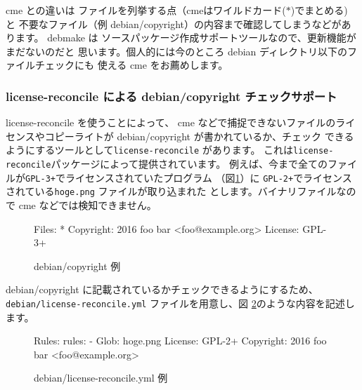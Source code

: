 \documentclass[mingoth,a4paper]{jsarticle}
\begin{document}

cme との違いは ファイルを列挙する点（cmeはワイルドカード($\ast$)でまとめる)
と 不要なファイル（例 debian/copyright）の内容まで確認してしまうなどがあります。
debmake は ソースパッケージ作成サポートツールなので、更新機能がまだないのだと
思います。個人的には今のところ debian ディレクトリ以下のファイルチェックにも
使える cme をお薦めします。

\subsubsection{license-reconcile による debian/copyright チェックサポート}


license-reconcile を使うことによって、
cme などで捕捉できないファイルのライセンスやコピーライトが debian/copyright が書かれているか、チェック
できるようにするツールとして\texttt{license-reconcile} があります。
これは\texttt{license-reconcile}パッケージによって提供されています。
例えば、今まで全てのファイルが\texttt{GPL-3+}でライセンスされていたプログラム
（図\ref{fig:example-copyright}）に
\texttt{GPL-2+}でライセンスされている\texttt{hoge.png} ファイルが取り込まれた
とします。バイナリファイルなので cme などでは検知できません。

\begin{figure}[htbp]
\begin{center}
\begin{commandline}
Files: *
Copyright: 2016 foo bar <foo@example.org>
License: GPL-3+
\end{commandline}
\end{center}
\caption{debian/copyright 例}
\label{fig:example-copyright}
\end{figure}

debian/copyright に記載されているかチェックできるようにするため、
\texttt{debian/license-reconcile.yml} ファイルを用意し、図
\ref{fig:example-license-reconcile}のような内容を記述します。

\begin{figure}[htbp]
\begin{center}
\begin{commandline}
Rules:
 rules:
  -
   Glob: hoge.png
   License: GPL-2+
   Copyright: 2016 foo bar <foo@example.org>
\end{commandline}
\end{center}
\caption{debian/license-reconcile.yml 例}
\label{fig:example-license-reconcile}
\end{figure}
\end{document}
